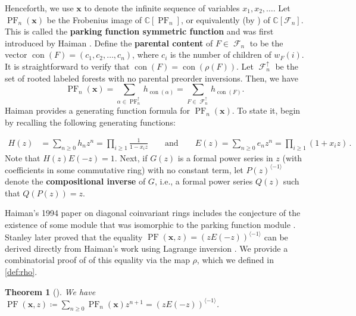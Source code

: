 \documentclass{amsart}
\newcommand{\CC}{\mathbb{C}}
\newcommand{\eqpd}{\, .}
\DeclareMathOperator{\PF}{PF}
\DeclareMathOperator{\con}{con}
\newcommand{\defterm}{\textbf}
\DeclareMathOperator{\F}{\mathcal{F}}
\newtheorem{theorem}{Theorem}[section]
\theoremstyle{definition}
\begin{document}
Henceforth, we use $\mathbf{x}$ to denote the infinite sequence of variables $x_1,x_2,\dots$. 
Let $\PF_n(\mathbf{x})$ be the Frobenius image of $\CC[\PF_n]$, or equivalently (by ) of $\CC[\mathcal{F}_n]$. 
This is called the \defterm{parking function symmetric function} and was first introduced by Haiman \cite{haiman_conjectures_1994}. 
Define the \defterm{parental content} of $F\in \F_n$ to be the vector $\con(F)=(c_1,c_2,\dots, c_{n})$, where $c_i$ is the number of children of $w_F(i)$. 
It is straightforward to verify that $\con(F)=\con(\rho(F))$. 
Let $\F_n^\uparrow$ be the set of rooted labeled forests with no parental preorder inversions.
Then, we have 
\begin{equation}\label{eq:PF-sym-as-rlf}
    \PF_n(\mathbf{x})=\sum_{\alpha\in \PF_n^\uparrow}h_{\con(\alpha)}=\sum_{F\in \F_n^\uparrow}h_{\con(F)}.
\end{equation}
Haiman provides a generating function formula for $\PF_n(\mathbf{x})$. 
To state it, begin by recalling the following generating functions:

\begin{align}
\label{def: H(z)}
H(z)&=\sum_{n\geq 0}h_nz^n=\prod_{i\geq 1}\frac{1}{1-x_iz}
\qquad \mbox{and} \qquad E(z)=\sum_{n\geq 0}e_nz^n=\prod_{i\geq 1}(1+x_iz) \eqpd 
\end{align}
Note that $H(z)E(-z)=1$. Next, if $G(z)$ is a formal power series in $z$ (with coefficients in some commutative ring) with no constant term,  let $P(z)^{\langle -1\rangle}$ denote the \defterm{compositional inverse} of $G$, i.e., a formal power series $Q(z)$ such that $Q(P(z))=z$. 

Haiman's 1994 paper on diagonal coinvariant rings includes the conjecture of the existence of some module that was isomorphic to the parking function module \cite[p. 28]{haiman_conjectures_1994}. Stanley later proved that the equality $\PF(\mathbf{x},z)=(zE(-z))^{\langle -1\rangle }$ can be derived directly from Haiman's work using Lagrange inversion \cite[Proposition 2.2]{stanley1997parking}. We provide a combinatorial proof of of this equality 
via the map $\rho$, which we defined in \eqref{def:rho}.

 \begin{theorem}[{\cite[Proposition 2.2]{stanley1997parking}}]\label{thm:lambet-w-symmetric}  We have
    $\PF(\mathbf{x},z)\coloneqq \sum_{n\geq 0}\PF_n(\mathbf{x})z^{n+1}=(zE(-z))^{\langle -1\rangle }$.
\end{theorem}
\end{document}

